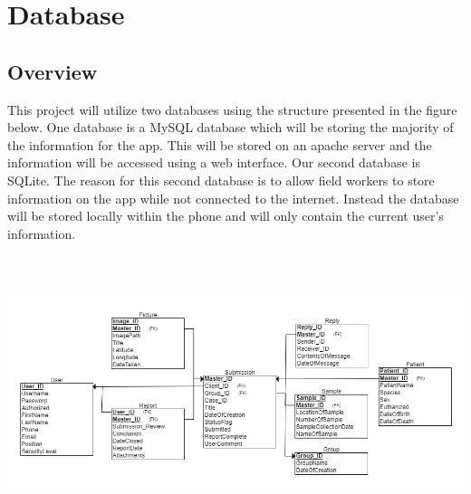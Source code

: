 \documentclass[onecolumn, draftclsnofoot, article, 10pt, compsoc]{IEEEtran}
\begin{document}
\section{Database}
\subsection{Overview}
This project will utilize two databases using the structure presented in the figure below. One database is a MySQL database which will be storing the majority of the information for the app. This will be stored on an apache server and the information will be accessed using a web interface. Our second database is SQLite. The reason for this second database is to allow field workers to store information on the app while not connected to the internet. Instead the database will be stored locally within the phone and will only contain the current user's information.

\includegraphics[height = 8cm]{My_Vet_Path.png}
\end{document}
